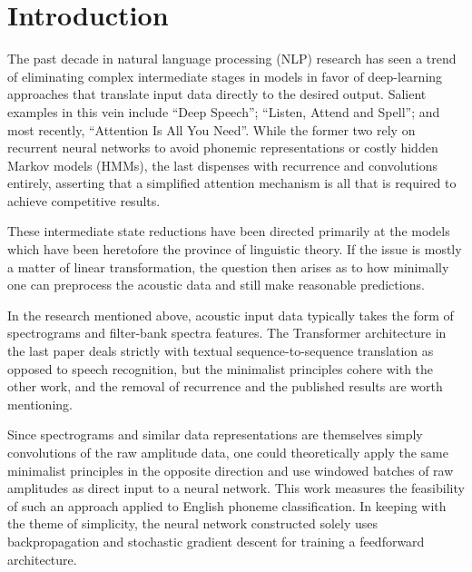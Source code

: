 \documentclass[10pt,epsf]{article}
\begin{document}
\section{Introduction}{
  The past decade in natural language processing (NLP) research has seen a trend of
  eliminating complex intermediate stages in models in favor of deep-learning approaches
  that translate input data directly to the desired output. Salient examples in this vein include
  ``Deep Speech''\autocite{deepspeech}; ``Listen, Attend and Spell''\autocite{LAS};
  and most recently, ``Attention Is All You Need''\autocite{AIAYN}. While the former two
  rely on recurrent neural networks to avoid phonemic representations or costly
  hidden Markov models (HMMs), the last dispenses with recurrence and convolutions
  entirely, asserting that a simplified attention mechanism is all that is required
  to achieve competitive results.

  These intermediate state reductions have been directed primarily at the models
  which have been heretofore the province of linguistic theory. If the issue is
  mostly a matter of linear transformation, the question then arises as to how
  minimally one can preprocess the acoustic data and still make reasonable predictions.

  In the research mentioned above, acoustic input data typically takes the form of
  spectrograms\autocite[2]{deepspeech} and filter-bank spectra features\autocite[2]{LAS}.
  The Transformer architecture in the last paper deals strictly with textual sequence-to-sequence
  translation as opposed to speech recognition, but the minimalist principles cohere with
  the other work, and the removal of recurrence and the published results are worth mentioning.

  Since spectrograms and similar data representations are themselves simply convolutions
  of the raw amplitude data, one could theoretically apply the same minimalist principles in
  the opposite direction and use windowed batches of raw amplitudes as direct input to
  a neural network. This work measures the feasibility of such an approach applied to
  English phoneme classification. In keeping with the theme of simplicity, the neural
  network constructed solely uses backpropagation and stochastic gradient descent for training
  a feedforward architecture.
}
\end{document}
